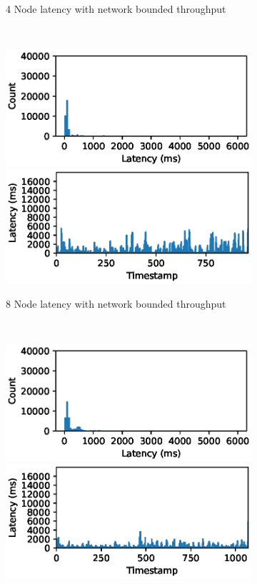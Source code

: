 \begin{figure}
\begin{subfigure}[b]{0.3\textwidth}
        \caption{4 Node latency with network bounded throughput }
    \end{subfigure}
   ~
    \begin{subfigure}[b]{0.3\textwidth}
        \includegraphics[width=\textwidth]{eps/flink_agg_8node_th_max_hist}
         \includegraphics[width=\textwidth]{eps/flink_agg_8node_th_max_ts}

        \caption{8 Node latency with network bounded throughput }
    \end{subfigure}
    ~ 
    \begin{subfigure}[b]{0.3\textwidth}
        \includegraphics[width=\textwidth]{eps/flink_agg_2node_th_90_hist}
         \includegraphics[width=\textwidth]{eps/flink_agg_2node_th_90_ts}


\end{subfigure}
\end{figure}
